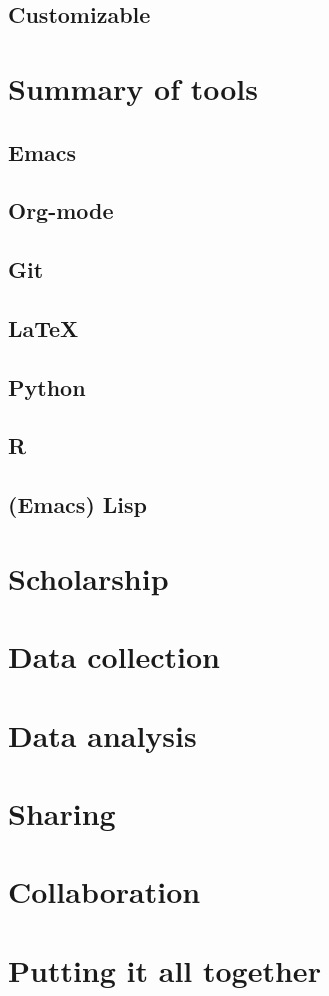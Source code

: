 \documentclass{book}
\begin{document}
\subsection{Customizable}
\label{sec-10-1-5}
\section{Summary of tools}
\label{sec-10-2}
\subsection{Emacs}
\label{sec-10-2-1}
\subsection{Org-mode}
\label{sec-10-2-2}
\subsection{Git}
\label{sec-10-2-3}
\subsection{\LaTeX{}}
\label{sec-10-2-4}
\subsection{Python}
\label{sec-10-2-5}
\subsection{R}
\label{sec-10-2-6}
\subsection{(Emacs) Lisp}
\label{sec-10-2-7}
\section{Scholarship}
\label{sec-10-3}
\section{Data collection}
\label{sec-10-4}
\section{Data analysis}
\label{sec-10-5}
\section{Sharing}
\label{sec-10-6}
\section{Collaboration}
\label{sec-10-7}
\section{Putting it all together}
\label{sec-10-8}


\printbibliography
\end{document}

